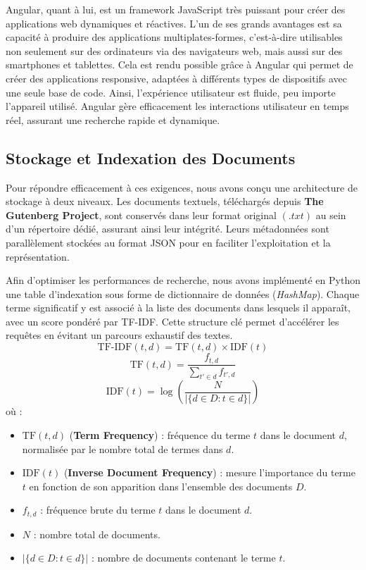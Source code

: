 \documentclass{article}
\begin{document}
    Angular, quant à lui, est un framework JavaScript très puissant pour créer des applications web dynamiques et réactives. L’un de ses grands avantages est sa capacité à produire des applications multiplates-formes, c’est-à-dire utilisables non seulement sur des ordinateurs via des navigateurs web, mais aussi sur des smartphones et tablettes. Cela est rendu possible grâce à Angular qui permet de créer des applications responsive, adaptées à différents types de dispositifs avec une seule base de code. Ainsi, l’expérience utilisateur est fluide, peu importe l’appareil utilisé. Angular gère efficacement les interactions utilisateur en temps réel, assurant une recherche rapide et dynamique.

    \subsection{Stockage et Indexation des Documents}
    Pour répondre efficacement à ces exigences, nous avons conçu une architecture de stockage à deux niveaux. Les documents textuels, téléchargés depuis \textbf{The Gutenberg Project}\cite{gutenberg}, sont conservés dans leur format original $(.txt)$ au sein d’un répertoire dédié, assurant ainsi leur intégrité. Leurs métadonnées sont parallèlement stockées au format JSON pour en faciliter l’exploitation et la représentation.

    Afin d’optimiser les performances de recherche, nous avons implémenté en Python une table d’indexation sous forme de dictionnaire de données (\textit{HashMap}). Chaque terme significatif y est associé à la liste des documents dans lesquels il apparaît, avec un score pondéré par TF-IDF. Cette structure clé permet d’accélérer les requêtes en évitant un parcours exhaustif des textes.
    \[
        \text{TF-IDF}(t, d) = \text{TF}(t, d) \times \text{IDF}(t)
    \]
    \[
        \text{TF}(t, d) = \frac{f_{t,d}}{\sum_{t' \in d} f_{t',d}}
    \]
    \[
        \text{IDF}(t) = \log \left( \frac{N}{|\{d \in D : t \in d\}|} \right)
    \]
    où :
    \begin{itemize}
        \item \( \text{TF}(t, d) \) (\textbf{Term Frequency}) : fréquence du terme $t$ dans le document $d$, normalisée par le nombre total de termes dans $d$.
        \item \( \text{IDF}(t) \) (\textbf{Inverse Document Frequency}) : mesure l’importance du terme $t$ en fonction de son apparition dans l’ensemble des documents $D$.
        \item  \( f_{t,d} \) : fréquence brute du terme $t$ dans le document $d$.
        \item $N$ : nombre total de documents.
        \item \( \left| \{d \in D : t \in d\} \right| \) : nombre de documents contenant le terme $t$.
    \end{itemize}
    
\end{document}
